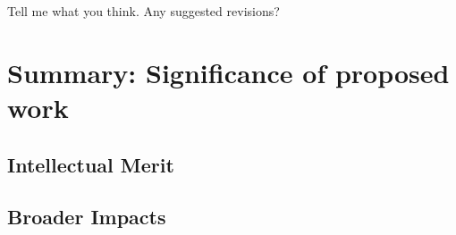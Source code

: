 \documentclass{proposalnsf}
\begin{document}
Tell me what you think. Any suggested revisions?

\section{Summary:  Significance of proposed work}

\subsection{Intellectual Merit}

\subsection{Broader Impacts}



\newpage
{}
\renewcommand{\thepage} {E--\arabic{page}}




\newpage
{}
\renewcommand{\thepage} {G--\arabic{page}}
\end{document}
